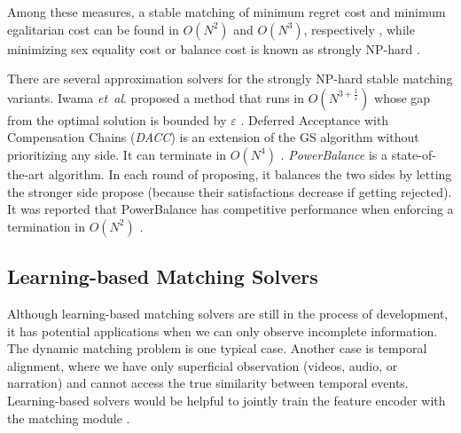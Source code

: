 Among these measures, a stable matching of minimum regret cost and minimum egalitarian cost can be found in $O(N^2)$ and $O(N^3)$, respectively \cite{gusfield1987three,irving1987efficient,feder1992new}, while minimizing sex equality cost or balance cost is known as strongly NP-hard \cite{kato1993complexity,mcdermid2014sex,feder1995stable}.

There are several approximation solvers for the strongly NP-hard stable matching variants. Iwama \emph{et~al$.$} proposed a method that runs in $O(N^{3+\frac{1}{\varepsilon}})$ whose gap from the optimal solution is bounded by $\varepsilon$ \cite{iwama}.
Deferred Acceptance with Compensation Chains 
(\textit{DACC}) is an extension of the GS algorithm without prioritizing any side. 
It can terminate in $O(N^4)$ \cite{dworczak2016deferred}. 
\textit{PowerBalance} is a state-of-the-art algorithm.
In each round of proposing, it balances the two sides by letting the stronger side propose (because their satisfactions decrease if getting rejected). 
It was reported that PowerBalance has competitive performance when enforcing a termination in $O(N^2)$ \cite{tziavelis2019equitable}.

\subsection{Learning-based Matching Solvers}\label{ss:mlap}
Although learning-based matching solvers are still in the process of development, it has potential applications when we can only observe incomplete information.
The dynamic matching problem \cite{wang2019adaptive} is one typical case.
Another case is temporal alignment, where we have only superficial observation (videos, audio, or narration) and cannot access the true similarity between temporal events. Learning-based solvers would be helpful to jointly train the feature encoder with the matching module \cite{fathony2018efficient}.

